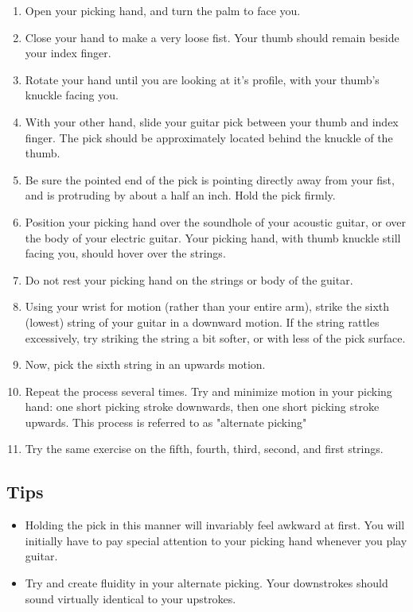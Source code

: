\begin{enumerate}
\item Open your picking hand, and turn the palm to face you.
\item Close your hand to make a very loose fist. Your thumb should remain
      beside your index finger.
\item Rotate your hand until you are looking at it's profile, with your thumb's
      knuckle facing you.
\item With your other hand, slide your guitar pick between your thumb and index
      finger. The pick should be approximately located behind the knuckle of the
      thumb.
\item Be sure the pointed end of the pick is pointing directly away from your
      fist, and is protruding by about a half an inch. Hold the pick firmly.
\item Position your picking hand over the soundhole of your acoustic guitar, or
      over the body of your electric guitar. Your picking hand, with thumb knuckle
      still facing you, should hover over the strings.
\item Do not rest your picking hand on the strings or body of the guitar.
\item Using your wrist for motion (rather than your entire arm), strike the
      sixth (lowest) string of your guitar in a downward motion. If the string
      rattles excessively, try striking the string a bit softer, or with less of the
      pick surface.
\item Now, pick the sixth string in an upwards motion.
\item Repeat the process several times. Try and minimize motion in your picking
      hand: one short picking stroke downwards, then one short picking stroke
      upwards. This process is referred to as "alternate picking"
\item Try the same exercise on the fifth, fourth, third, second, and first strings.
\end{enumerate}
%
\subsection{Tips}
\begin{itemize}
\item Holding the pick in this manner will invariably feel awkward at first.
      You will initially have to pay special attention to your picking hand whenever
      you play guitar.
\item Try and create fluidity in your alternate picking. Your downstrokes
      should sound virtually identical to your upstrokes.
\end{itemize}

